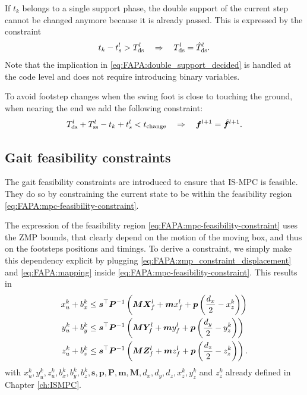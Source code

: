 If $t_k$ belongs to a single support phase, the double support of the current
step cannot be changed anymore because it is already passed. This is expressed
by the constraint
\begin{equation}
	t_k - t_s^l > T^l_{\rm{ds}} \quad \Rightarrow \quad  T^l_{\rm{ds}} = \hat T^l_{\rm{ds}}.
	\label{eq:FAPA:double_support_decided}
\end{equation}
Note that the implication in \eqref{eq:FAPA:double_support_decided} is handled
at the code level and does not require introducing binary variables.

To avoid footstep changes when the swing foot is close to touching the ground,
when nearing the end we add the following constraint:
\begin{equation}
    \label{eq:FAPA:swing_foot_constraint}
	T^l_{\rm ds} + T^l_{\rm ss} - t_k + t_s^l < t_{\mathrm{change}} \quad \Rightarrow \quad
	{\bm{f}}^{l+1} = \hat{{\bm{f}}}^{l+1}.
\end{equation}

\subsection{Gait feasibility constraints}
The gait feasibility constraints are introduced to ensure that IS-MPC is
feasible. They do so by constraining the current state to be within the
feasibility region \eqref{eq:FAPA:mpc-feasibility-constraint}.

The expression of the feasibility region
\eqref{eq:FAPA:mpc-feasibility-constraint} uses the ZMP bounds, that clearly
depend on the motion of the moving box, and thus on the footsteps positions
and timings. To derive a constraint, we simply make this dependency explicit
by plugging \eqref{eq:FAPA:zmp_constraint_displacement} and
\eqref{eq:FAPA:mapping} inside \eqref{eq:FAPA:mpc-feasibility-constraint}.
This results in
\begin{equation}
    \label{eq:FAPA:gait_feasibility_constraint}
    \begin{aligned}
        x_u^k + b_x^k &\le \bm{s}^\top \bm{P}^{-1} \left({\bm{M}}{\bm{X}}_f^l + {\bm{m}} x_f^l + \bm{p} \left(\frac{d_x}{2} - x_z^k\right)\right) \\
        y_u^k + b_y^k &\le \bm{s}^\top \bm{P}^{-1} \left({\bm{M}}{\bm{Y}}_f^l + {\bm{m}} y_f^l + \bm{p} \left(\frac{d_y}{2} - y_z^k\right)\right) \\
        z_u^k + b_z^k &\le \bm{s}^\top \bm{P}^{-1} \left({\bm{M}}{\bm{Z}}_f^l + {\bm{m}} z_f^l + \bm{p} \left(\frac{d_z}{2} - z_z^k\right)\right).
    \end{aligned}
\end{equation}
with $x_u^k, y_u^k, z_u^k, b_x^k, b_y^k, b_z^k, \bm{s}, \bm{p}, \bm{P}, \bm{m}, \bm{M}, d_x, d_y, d_z, x_z^k, y_z^k$ and $z_z^k$
already defined in Chapter \ref{ch:ISMPC}.

